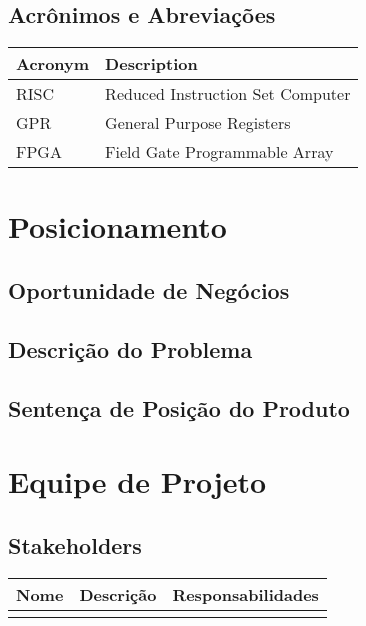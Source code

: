\documentclass{article}
\begin{document}
\subsection{Acrônimos e Abreviações}
  \FloatBarrier
  \begin{table}[H]
    \begin{center}
      \begin{tabular}[pos]{|m{2cm} | m{9cm}|} 
        \hline
        \cellcolor[gray]{0.9}\textbf{Acronym} & \cellcolor[gray]{0.9}\textbf{Description} \\ \hline
        RISC & Reduced Instruction Set Computer \\ \hline
        GPR & General Purpose Registers \\ \hline
        FPGA & Field Gate Programmable Array \\ \hline
      \end{tabular}
    \end{center}
  \end{table}
  

\section{Posicionamento}
\subsection{Oportunidade de Negócios}

\subsection{Descrição do Problema}

\subsection{Sentença de Posição do Produto}

\section{Equipe de Projeto}

\subsection{Stakeholders}

  \FloatBarrier
  \begin{table}[H]
    \begin{center}
      \begin{tabular}[pos]{|m{4cm} | m{5cm}| m{6cm} |} 
        \hline
        \cellcolor[gray]{0.9}\textbf{Nome} & \cellcolor[gray]{0.9}\textbf{Descrição} & \cellcolor[gray]{0.9}\textbf{Responsabilidades}\\ \hline
         & & \\ \hline
       
      \end{tabular}
    \end{center}
  \end{table}
\end{document}
